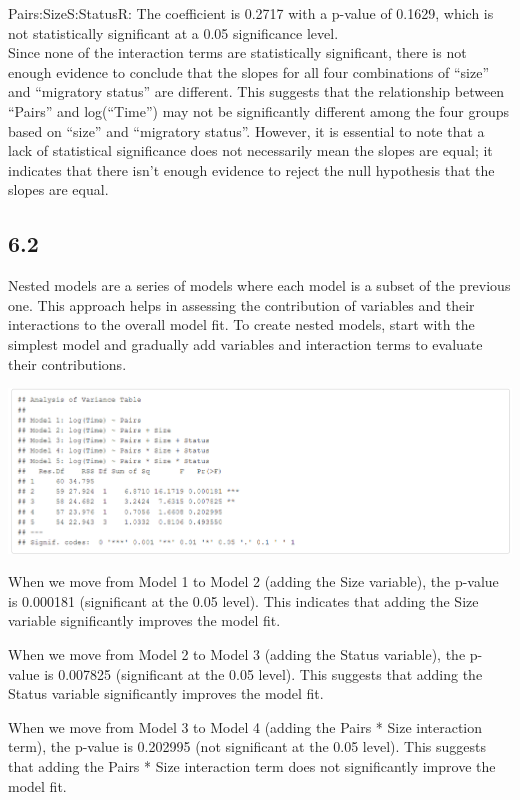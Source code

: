 \documentclass{article}
\begin{document}
Pairs:SizeS:StatusR: The coefficient is 0.2717 with a p-value of 0.1629, which is not statistically significant at a 0.05 significance level. \\

Since none of the interaction terms are statistically significant, there is not enough evidence to conclude that the slopes for all four combinations of “size” and “migratory status” are different. This suggests that the relationship between “Pairs” and log(“Time”) may not be significantly different among the four groups based on “size” and “migratory status”. However, it is essential to note that a lack of statistical significance does not necessarily mean the slopes are equal; it indicates that there isn’t enough evidence to reject the null hypothesis that the slopes are equal.

\subsection*{6.2}
Nested models are a series of models where each model is a subset of the previous one. This approach helps in assessing the contribution of variables and their interactions to the overall model fit. To create nested models, start with the simplest model and gradually add variables and interaction terms to evaluate their contributions.


\includegraphics[scale=0.5]{tables/variance-table.png}


When we move from Model 1 to Model 2 (adding the Size variable), the p-value is 0.000181 (significant at the 0.05 level). This indicates that adding the Size variable significantly improves the model fit.

When we move from Model 2 to Model 3 (adding the Status variable), the p-value is 0.007825 (significant at the 0.05 level). This suggests that adding the Status variable significantly improves the model fit.

When we move from Model 3 to Model 4 (adding the Pairs * Size interaction term), the p-value is 0.202995 (not significant at the 0.05 level). This suggests that adding the Pairs * Size interaction term does not significantly improve the model fit.
\end{document}
